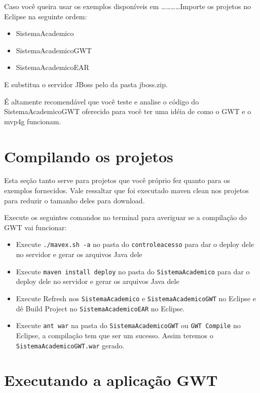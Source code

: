 Caso você queira usar os exemplos disponíveis em \ldots\ldots\ldots\ldots Importe os projetos no Eclipse na seguinte ordem:

\begin{itemize}
  \item SistemaAcademico
  \item SistemaAcademicoGWT
  \item SistemaAcademicoEAR
\end{itemize}

E substitua o servidor JBoss pelo da pasta jboss.zip.

É altamente recomendável que você teste e analise o código do SistemaAcademicoGWT oferecido para você ter uma idéia de como o GWT
e o mvp4g funcionam.

\section{Compilando os projetos}

Esta seção tanto serve para projetos que você próprio fez quanto para os exemplos fornecidos. Vale ressaltar que foi executado
maven clean nos projetos para reduzir o tamanho deles para download. 

Execute os seguintes comandos no terminal para averiguar se a compilação do GWT vai funcionar:

\begin{itemize}
  \item Execute \texttt{./mavex.sh -a} no pasta do \texttt{controleacesso} para dar o deploy dele no servidor e gerar os arquivos
  Java dele
  \item Execute \texttt{maven install deploy} no pasta do \texttt{SistemaAcademico} para dar o deploy dele no servidor e gerar os
  arquivos Java dele
  \item Execute Refresh nos \texttt{SistemaAcademico} e \texttt{SistemaAcademicoGWT} no Eclipse e dê Build Project no
  \texttt{SistemaAcademicoEAR} no Eclipse.
  \item Execute \texttt{ant war} na pasta do \texttt{SistemaAcademicoGWT} ou \texttt{GWT Compile} no Eclipse, a compilação tem que
  ser um sucesso.
  Assim teremos o \texttt{SistemaAcademicoGWT.war} gerado.
\end{itemize}

\section{Executando a aplicação GWT}

